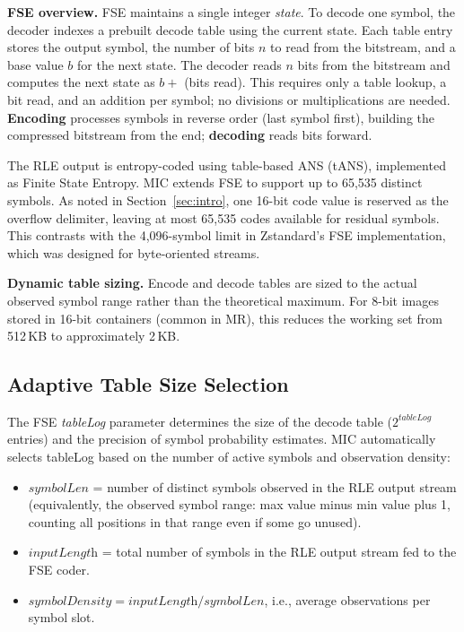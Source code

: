 \documentclass[journal]{IEEEtran}
\begin{document}
\textbf{FSE overview.} FSE maintains a single integer \emph{state}. To decode
one symbol, the decoder indexes a prebuilt decode table using the current state.
Each table entry stores the output symbol, the number of bits $n$ to read from
the bitstream, and a base value $b$ for the next state. The decoder reads $n$
bits from the bitstream and computes the next state as $b +$ (bits read). This
requires only a table lookup, a bit read, and an addition per symbol; no
divisions or multiplications are needed. \textbf{Encoding} processes symbols in
reverse order (last symbol first), building the compressed bitstream from the
end; \textbf{decoding} reads bits forward.

The RLE output is entropy-coded using table-based ANS (tANS), implemented as
Finite State Entropy. MIC extends FSE to support up to 65,535 distinct symbols.
As noted in Section~\ref{sec:intro}, one 16-bit code value is reserved as the
overflow delimiter, leaving at most 65,535 codes available for residual symbols.
This contrasts with the 4,096-symbol limit in Zstandard's FSE implementation,
which was designed for byte-oriented streams.

\textbf{Dynamic table sizing.} Encode and decode tables are sized to the actual
observed symbol range rather than the theoretical maximum. For 8-bit
images stored in 16-bit containers (common in MR), this reduces the working set
from 512\,KB to approximately 2\,KB.

\subsection{Adaptive Table Size Selection}

The FSE \emph{tableLog} parameter determines the size of the decode table
($2^{\textit{tableLog}}$ entries) and the precision of symbol probability
estimates. MIC automatically selects tableLog based on the number of active
symbols and observation density:
\begin{itemize}
  \item $\textit{symbolLen}$ = number of distinct symbols observed in the RLE
  output stream (equivalently, the observed symbol range: max value minus
  min value plus 1, counting all positions in that range even if some go
  unused).
  \item $\textit{inputLength}$ = total number of symbols in the RLE output
  stream fed to the FSE coder.
  \item $\textit{symbolDensity} = \textit{inputLength} / \textit{symbolLen}$,
  i.e., average observations per symbol slot.
\end{itemize}
\end{document}
